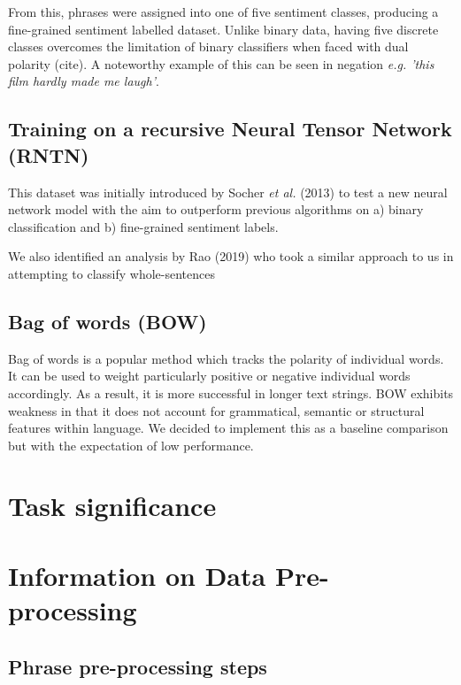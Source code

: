 \documentclass[10pt, a4paper]{article}
\begin{document}
From this, phrases were assigned into one of five sentiment classes, producing a fine-grained sentiment labelled dataset. Unlike binary data, having five discrete classes overcomes the limitation of binary classifiers when faced with dual polarity (cite). A noteworthy example of this can be seen in negation \textit{e.g. 'this film hardly made me laugh'}. 

\subsection{Training on a recursive Neural Tensor Network (RNTN)}
This dataset was initially introduced by Socher \textit{et al.} (2013) to test a new neural network model with the aim to outperform previous algorithms on a) binary classification and b) fine-grained sentiment labels.

We also identified an analysis by Rao (2019) who took a similar approach to us in attempting to classify whole-sentences

\subsection{Bag of words (BOW)}
Bag of words is a popular method which tracks the polarity of individual words. It can be used to weight particularly positive or negative individual words accordingly. As a result, it is more successful in longer text strings. BOW exhibits weakness in that it does not account for grammatical, semantic or structural features within language. We decided to implement this as a baseline comparison but with the expectation of low performance.









\section{Task significance}











\section{Information on Data Pre-processing}

\subsection{Phrase pre-processing steps}
\end{document}
